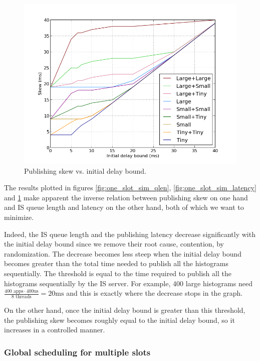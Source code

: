 \begin{figure}[ht]
\centering
\includegraphics[scale=0.5]{Images/one_slot_sim_skew.png}
\caption{Publishing skew vs. initial delay bound.}
\label{fig:one_slot_sim_skew}
\end{figure}

The results plotted in figures \ref{fig:one_slot_sim_qlen}, \ref{fig:one_slot_sim_latency} and \ref{fig:one_slot_sim_skew} make apparent the inverse relation between publishing skew on one hand and IS queue length and latency on the other hand, both of which we want to minimize. 

Indeed, the IS queue length and the publishing latency decrease significantly with the initial delay bound since we remove their root cause, contention, by randomization. The decrease becomes less steep when the initial delay bound becomes greater than the total time needed to publish all the histograms sequentially. The threshold is equal to the time required to publish all the histograms sequentially by the IS server. For example, 400 large histograms need $\frac {400 \text{ apps}\cdot 400 \text{us}} {8 \text{ threads}} = 20\text{ms}$ and this is exactly where the decrease stops in the graph.

On the other hand, once the initial delay bound is greater than this threshold, the publishing skew becomes roughly equal to the initial delay bound, so it increases in a controlled manner.

\subsubsection*{Global scheduling for multiple slots}

